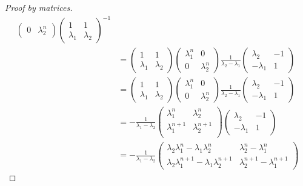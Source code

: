 \begin{proof}[Proof by matrices]
\begin{align*}
\begin{pmatrix}
   0 & \lambda_2^n
  \end{pmatrix}
  \begin{pmatrix}
   1 & 1 \\
   \lambda_1 & \lambda_2
  \end{pmatrix}^{-1} \\
  &=
  \begin{pmatrix}
   1 & 1 \\
   \lambda_1 & \lambda_2
  \end{pmatrix}
  \begin{pmatrix}
   \lambda_1^n & 0 \\
   0 & \lambda_2^n
  \end{pmatrix}
  \frac 1{\lambda_2 - \lambda_1}
  \begin{pmatrix}
   \lambda_2 & -1 \\
   -\lambda_1 & 1
  \end{pmatrix} \\
  &=
  \begin{pmatrix}
   1 & 1 \\
   \lambda_1 & \lambda_2
  \end{pmatrix}
  \begin{pmatrix}
   \lambda_1^n & 0 \\
   0 & \lambda_2^n
  \end{pmatrix}
  \frac 1{\lambda_2 - \lambda_1}
  \begin{pmatrix}
   \lambda_2 & -1 \\
   -\lambda_1 & 1
  \end{pmatrix} \\
  &=
  -\frac 1{\lambda_1 - \lambda_2}
  \begin{pmatrix}
   \lambda_1^n & \lambda_2^n \\
   \lambda_1^{n + 1} & \lambda_2^{n + 1} \\
  \end{pmatrix}
  \begin{pmatrix}
   \lambda_2 & -1 \\
   -\lambda_1 & 1
  \end{pmatrix} \\
  &=
  -\frac 1{\lambda_1 - \lambda_2}
  \begin{pmatrix}
   \lambda_2 \lambda_1^n -\lambda_1 \lambda_2^n & \lambda_2^n - \lambda_1^n \\
   \lambda_2 \lambda_1^{n + 1} - \lambda_1 \lambda_2^{n + 1} &
       \lambda_2^{n + 1} - \lambda_1^{n + 1}
  \end{pmatrix}
 \end{align*}

\end{proof}
